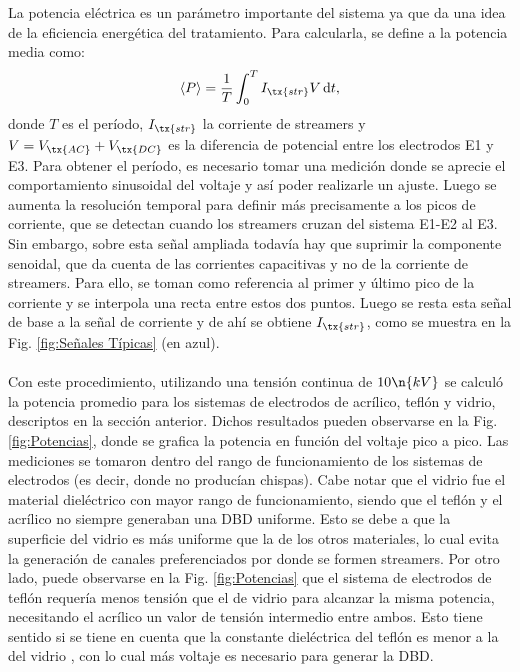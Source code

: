 La potencia eléctrica es un parámetro importante del sistema ya que da una idea de la eficiencia energética del tratamiento. Para calcularla, se define a la potencia media como:
\begin{equation*}
    \langle P \rangle = \frac{1}{T} \int_0^T I_{\tx{str}} V \,\text{d}t,
\end{equation*}
donde $T$ es el período, $I_{\tx{str}}$ la corriente de streamers y $V = V_{\tx{AC}} + V_{\tx{DC}}$ es la diferencia de potencial entre los electrodos E1 y E3. Para obtener el período, es necesario tomar una medición donde se aprecie el comportamiento sinusoidal del voltaje y así poder realizarle un ajuste. Luego se aumenta la resolución temporal para definir más precisamente a los picos de corriente, que se detectan cuando los streamers cruzan del sistema E1-E2 al E3. Sin embargo, sobre esta señal ampliada todavía hay que suprimir la componente senoidal, que da cuenta de las corrientes capacitivas y no de la corriente de streamers. Para ello, se toman como referencia al primer y último pico de la corriente y se interpola una recta entre estos dos puntos. Luego se resta esta señal de base a la señal de corriente y de ahí se obtiene $I_{\tx{str}}$, como se muestra en la Fig. \ref{fig:Señales Típicas} (en azul). \\\\
Con este procedimiento, utilizando una tensión continua de $10 \n{kV}$ se calculó la potencia promedio para los sistemas de electrodos de acrílico, teflón y vidrio, descriptos en la sección anterior. Dichos resultados pueden observarse en la Fig. \ref{fig:Potencias}, donde se grafica la potencia en función del voltaje pico a pico. Las mediciones se tomaron dentro del rango de funcionamiento de los sistemas de electrodos (es decir, donde no producían chispas). Cabe notar que el vidrio fue el material dieléctrico con mayor rango de funcionamiento, siendo que el teflón y el acrílico no siempre generaban una DBD uniforme. Esto se debe a que la superficie del vidrio es más uniforme que la de los otros materiales, lo cual evita la generación de canales preferenciados por donde se formen streamers. Por otro lado, puede observarse en la Fig. \ref{fig:Potencias} que el sistema de electrodos de teflón requería menos tensión que el de vidrio para alcanzar la misma potencia, necesitando el acrílico un valor de tensión intermedio entre ambos. Esto tiene sentido si se tiene en cuenta que la constante dieléctrica del teflón es menor a la del vidrio , con lo cual más voltaje es necesario para generar la DBD.

